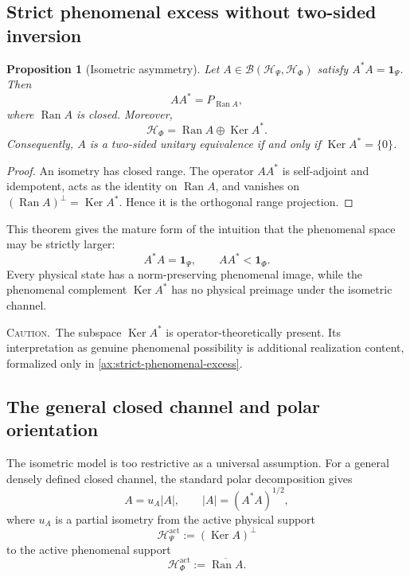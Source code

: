 \documentclass[11pt,reqno]{scrartcl}
\newcommand{\scrHP}{\mathscr H_{\Psi}}
\newcommand{\scrHF}{\mathscr H_{\Phi}}
\newcommand{\idop}{\mathbf 1}
\DeclareMathOperator{\Ran}{Ran}
\DeclareMathOperator{\Ker}{Ker}
\newcommand{\warninglabel}{\par\smallskip\noindent\textsc{Caution.}\ }
\theoremstyle{plain}
\newtheorem{proposition}[proposition]{Proposition}
\theoremstyle{definition}
\theoremstyle{remark}
\begin{document}
\subsection{Strict phenomenal excess without two-sided inversion}

\begin{proposition}[Isometric asymmetry]
\label{prop:isometric-asymmetry}
Let \(A\in\mathcal B(\scrHP,\scrHF)\) satisfy \(A^*A=\idop_{\Psi}\).  Then
\begin{equation}
  AA^*=P_{\Ran A},
  \label{eq:range-projection}
\end{equation}
where \(\Ran A\) is closed.  Moreover,
\begin{equation}
  \scrHF=\Ran A\oplus\Ker A^*.
  \label{eq:phenomenal-decomposition}
\end{equation}
Consequently, \(A\) is a two-sided unitary equivalence if and only if
\(\Ker A^*=\{0\}\).
\end{proposition}

\begin{proof}
An isometry has closed range.  The operator \(AA^*\) is self-adjoint and
idempotent, acts as the identity on \(\Ran A\), and vanishes on
\((\Ran A)^\perp=\Ker A^*\).  Hence it is the orthogonal range projection.
\end{proof}

This theorem gives the mature form of the intuition that the phenomenal space
may be strictly larger:
\begin{equation}
  A^*A=\idop_{\Psi},
  \qquad
  AA^*<\idop_{\Phi}.
  \label{eq:strict-asymmetry}
\end{equation}
Every physical state has a norm-preserving phenomenal image, while the
phenomenal complement \(\Ker A^*\) has no physical preimage under the
isometric channel.

\warninglabel The subspace \(\Ker A^*\) is operator-theoretically present.
Its interpretation as genuine phenomenal possibility is additional
realization content, formalized only in \cref{ax:strict-phenomenal-excess}.

\subsection{The general closed channel and polar orientation}

The isometric model is too restrictive as a universal assumption.  For a
general densely defined closed channel, the standard polar decomposition
\cite{Kato,ReedSimon} gives
\begin{equation}
  A=u_A|A|,
  \qquad
  |A|=(A^*A)^{1/2},
  \label{eq:polar-decomposition}
\end{equation}
where \(u_A\) is a partial isometry from the active physical support
\begin{equation}
  \scrHP^{\mathrm{act}}:=(\Ker A)^\perp
\end{equation}
to the active phenomenal support
\begin{equation}
  \scrHF^{\mathrm{act}}:=\overline{\Ran A}.
\end{equation}
\end{document}
